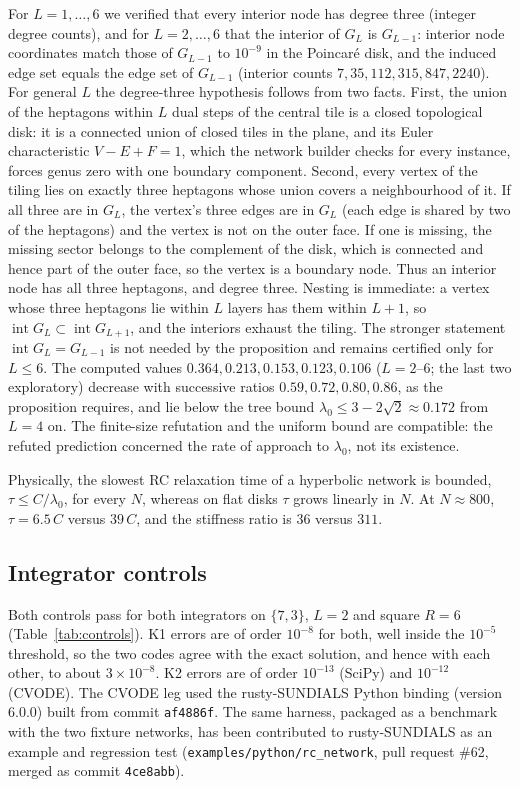 \documentclass[11pt,a4paper]{article}
\begin{document}
For $L=1,\dots,6$ we verified that every interior node has degree three (integer degree counts), and for
$L=2,\dots,6$ that the interior of $G_L$ is $G_{L-1}$: interior node coordinates match those of $G_{L-1}$ to
$10^{-9}$ in the Poincar\'e disk, and the induced edge set equals the edge set of $G_{L-1}$ (interior counts
$7, 35, 112, 315, 847, 2240$). For general $L$ the degree-three hypothesis follows from two facts. First, the union
of the heptagons within $L$ dual steps of the central tile is a closed topological disk: it is a connected union of
closed tiles in the plane, and its Euler characteristic $V-E+F=1$, which the network builder checks for every
instance, forces genus zero with one boundary component. Second, every vertex of the tiling lies on exactly three
heptagons whose union covers a neighbourhood of it. If all three are in $G_L$, the vertex's three edges are in $G_L$
(each edge is shared by two of the heptagons) and the vertex is not on the outer face. If one is missing, the
missing sector belongs to the complement of the disk, which is connected and hence part of the outer face, so the
vertex is a boundary node. Thus an interior node has all three heptagons, and degree three. Nesting is immediate:
a vertex whose three heptagons lie within $L$ layers has them within $L+1$, so $\operatorname{int}G_L\subset
\operatorname{int}G_{L+1}$, and the interiors exhaust the tiling. The stronger statement
$\operatorname{int}G_L=G_{L-1}$ is not needed by the proposition and remains certified only for $L\le6$. The
computed values
$0.364, 0.213, 0.153, 0.123, 0.106$ ($L=2$--$6$; the last two exploratory) decrease with successive ratios
$0.59, 0.72, 0.80, 0.86$, as the proposition requires, and lie below the tree bound $\lambda_0\le3-2\sqrt2\approx0.172$
from $L=4$ on. The finite-size refutation and the uniform bound are compatible: the refuted prediction concerned the
rate of approach to $\lambda_0$, not its existence.

Physically, the slowest RC relaxation time of a hyperbolic network is bounded, $\tau\le C/\lambda_0$, for every $N$,
whereas on flat disks $\tau$ grows linearly in $N$. At $N\approx800$, $\tau=6.5\,C$ versus $39\,C$, and the stiffness
ratio is $36$ versus $311$.

\subsection{Integrator controls}
Both controls pass for both integrators on $\{7,3\}$, $L=2$ and square $R=6$ (Table~\ref{tab:controls}). K1 errors
are of order $10^{-8}$ for both, well inside the $10^{-5}$ threshold, so the two codes agree with the exact
solution, and hence with each other, to about $3\times10^{-8}$. K2 errors are of order $10^{-13}$ (SciPy) and
$10^{-12}$ (CVODE). The CVODE leg used the rusty-SUNDIALS Python binding (version 6.0.0) built from
commit \texttt{af4886f}. The same harness, packaged as a benchmark with the two fixture networks, has been
contributed to rusty-SUNDIALS as an example and regression test (\texttt{examples/python/rc\_network}, pull
request \#62, merged as commit \texttt{4ce8abb}).
\end{document}
